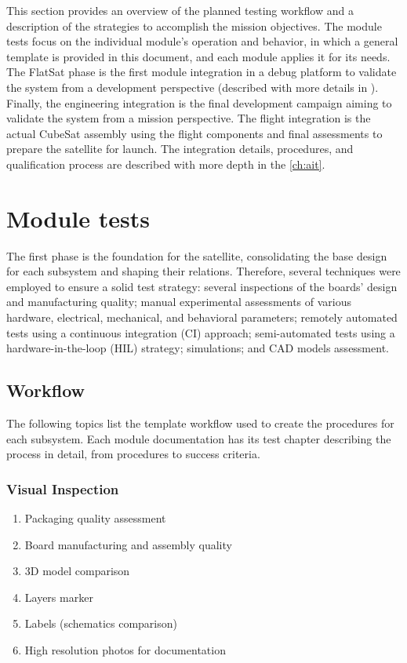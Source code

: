 This section provides an overview of the planned testing workflow and a description of the strategies to accomplish the mission objectives. The module tests focus on the individual module's operation and behavior, in which a general template is provided in this document, and each module applies it for its needs. The FlatSat phase is the first module integration in a debug platform to validate the system from a development perspective (described with more details in \cite{flatsat}). Finally, the engineering integration is the final development campaign aiming to validate the system from a mission perspective. The flight integration is the actual CubeSat assembly using the flight components and final assessments to prepare the satellite for launch. The integration details, procedures, and qualification process are described with more depth in the \autoref{ch:ait}. %

\section{Module tests}

The first phase is the foundation for the satellite, consolidating the base design for each subsystem and shaping their relations. Therefore, several techniques were employed to ensure a solid test strategy: several inspections of the boards' design and manufacturing quality; manual experimental assessments of various hardware, electrical, mechanical, and behavioral parameters; remotely automated tests using a continuous integration (CI) approach; semi-automated tests using a hardware-in-the-loop (HIL) strategy; simulations; and CAD models assessment.

\subsection{Workflow}

The following topics list the template workflow used to create the procedures for each subsystem. Each module documentation has its test chapter describing the process in detail, from procedures to success criteria.

\subsubsection{Visual Inspection}

\begin{enumerate} \setlength\itemsep{-0.3em}
    \item Packaging quality assessment
    \item Board manufacturing and assembly quality
    \item 3D model comparison
    \item Layers marker
    \item Labels (schematics comparison) 
    \item High resolution photos for documentation
\end{enumerate}

